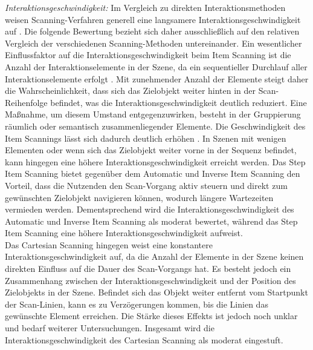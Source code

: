 \textit{Interaktionsgeschwindigkeit:}
Im Vergleich zu direkten Interaktionsmethoden weisen Scanning-Verfahren generell eine langsamere Interaktionsgeschwindigkeit auf \citep{COOK2015117}. Die folgende Bewertung bezieht sich daher ausschließlich auf den relativen Vergleich der verschiedenen Scanning-Methoden untereinander. 
Ein wesentlicher Einflussfaktor auf die Interaktionsgeschwindigkeit beim Item Scanning ist die Anzahl der Interaktionselemente in der Szene, da ein sequentieller Durchlauf aller Interaktionselemente erfolgt \cite{10.1145/2159365.2159386}. Mit zunehmender Anzahl der Elemente steigt daher die Wahrscheinlichkeit, dass sich das Zielobjekt weiter hinten in der Scan-Reihenfolge befindet, was die Interaktionsgeschwindigkeit deutlich reduziert. Eine Maßnahme, um diesem Umstand entgegenzuwirken, besteht in der Gruppierung räumlich oder semantisch zusammenliegender Elemente. Die Geschwindigkeit des Item Scannings lässt sich dadurch deutlich erhöhen \citep{COOK2015117}. In Szenen mit wenigen Elementen oder wenn sich das Zielobjekt weiter vorne in der Sequenz befindet, kann hingegen eine höhere Interaktionsgeschwindigkeit erreicht werden. Das Step Item Scanning bietet gegenüber dem Automatic und Inverse Item Scanning den Vorteil, dass die Nutzenden den Scan-Vorgang aktiv steuern und direkt zum gewünschten Zielobjekt navigieren können, wodurch längere Wartezeiten vermieden werden. Dementsprechend wird die Interaktionsgeschwindigkeit des Automatic und Inverse Item Scanning als moderat bewertet, während das Step Item Scanning eine höhere Interaktionsgeschwindigkeit aufweist.\\
Das Cartesian Scanning hingegen weist eine konstantere Interaktionsgeschwindigkeit auf, da die Anzahl der Elemente in der Szene keinen direkten Einfluss auf die Dauer des Scan-Vorgangs hat. Es besteht jedoch ein Zusammenhang zwischen der Interaktionsgeschwindigkeit und der Position des Zielobjekts in der Szene. Befindet sich das Objekt weiter entfernt vom Startpunkt der Scan-Linien, kann es zu Verzögerungen kommen, bis die Linien das gewünschte Element erreichen. Die Stärke dieses Effekts ist jedoch noch unklar und bedarf weiterer Untersuchungen. Insgesamt wird die Interaktionsgeschwindigkeit des Cartesian Scanning als moderat eingestuft.

